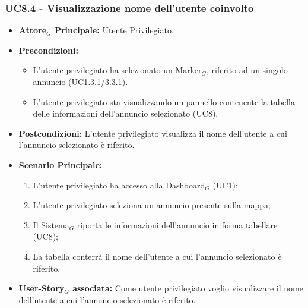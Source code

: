 \documentclass[10pt]{article}
\begin{document}
\begin{justify}
 \subsubsection{\textbf{UC8.4 - Visualizzazione nome dell'utente coinvolto}}
 \begin{itemize}
     \item \textbf{Attore$_G$ Principale:} Utente Privilegiato.
     \item \textbf{Precondizioni:}
       \begin{itemize}
    	        \item L'utente privilegiato ha selezionato un Marker$_G$, riferito ad un singolo annuncio (UC1.3.1/3.3.1).
          \item L'utente privilegiato sta visualizzando un pannello contenente la tabella delle informazioni dell'annuncio selezionato (UC8).
       \end{itemize}
     \item \textbf{Postcondizioni:} L'utente privilegiato visualizza il nome dell'utente a cui l'annuncio selezionato è riferito.
     \item \textbf{Scenario Principale:}
        \begin{enumerate}
            \item L'utente privilegiato ha accesso alla Dashboard$_G$ (UC1);
            \item L'utente privilegiato seleziona un annuncio presente sulla mappa;
            \item Il Sistema$_G$ riporta le informazioni dell'annuncio in forma tabellare (UC8);
            \item La tabella conterrà il nome dell'utente a cui l'annuncio selezionato è riferito.
        \end{enumerate}
     \item \textbf{User-Story$_G$ associata:} Come utente privilegiato voglio visualizzare il nome dell'utente a cui l'annuncio selezionato è riferito. 
 \end{itemize}

\end{justify}
\end{document}
